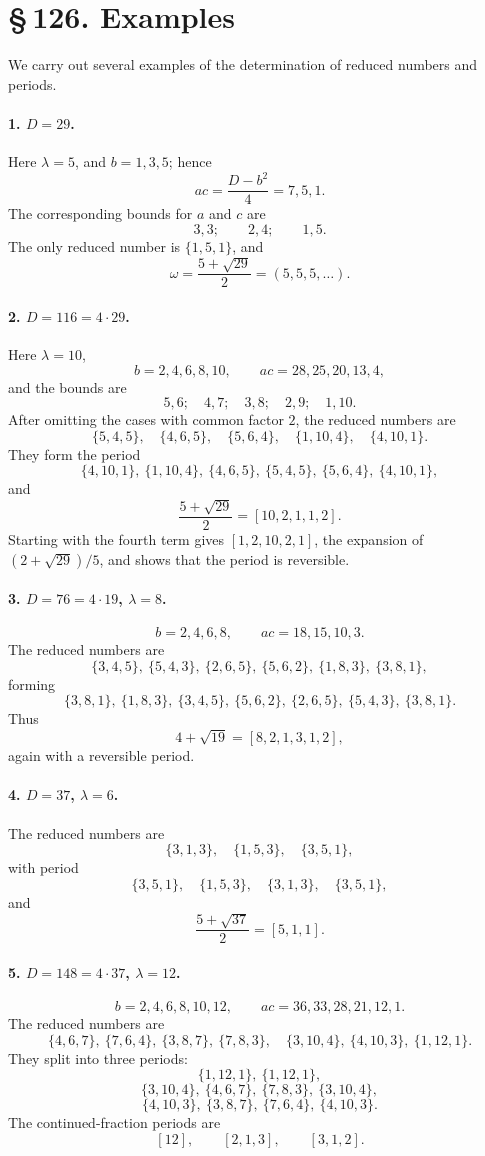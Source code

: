 \documentclass[11pt]{article}
\providecommand{\sect}[2]{\section*{\S\,#1. #2}}
\begin{document}
\sect{126}{Examples}

We carry out several examples of the determination of reduced numbers and periods.

\paragraph{1. $D=29$.}
Here $\lambda=5$, and $b=1,3,5$; hence
\[
        ac=\frac{D-b^2}{4}=7,5,1.
\]
The corresponding bounds for $a$ and $c$ are
\[
        3,3;\qquad 2,4;\qquad 1,5.
\]
The only reduced number is $\{1,5,1\}$, and
\[
        \omega=\frac{5+\sqrt{29}}2=(5,5,5,\ldots).
\]

\paragraph{2. $D=116=4\cdot29$.}
Here $\lambda=10$,
\[
        b=2,4,6,8,10,\qquad ac=28,25,20,13,4,
\]
and the bounds are
\[
        5,6;\quad 4,7;\quad 3,8;\quad 2,9;\quad 1,10.
\]
After omitting the cases with common factor $2$, the reduced numbers are
\[
\{5,4,5\},\quad \{4,6,5\},\quad \{5,6,4\},\quad
\{1,10,4\},\quad \{4,10,1\}.
\]
They form the period
\[
\{4,10,1\},\ \{1,10,4\},\ \{4,6,5\},\ \{5,4,5\},\ \{5,6,4\},\ \{4,10,1\},
\]
and
\[
        \frac{5+\sqrt{29}}2=[10,2,1,1,2].
\]
Starting with the fourth term gives $[1,2,10,2,1]$, the expansion of $(2+\sqrt{29})/5$, and shows that the period is reversible.

\paragraph{3. $D=76=4\cdot19$, $\lambda=8$.}
\[
        b=2,4,6,8,\qquad ac=18,15,10,3.
\]
The reduced numbers are
\[
\{3,4,5\},\ \{5,4,3\},\ \{2,6,5\},\ \{5,6,2\},\ \{1,8,3\},\ \{3,8,1\},
\]
forming
\[
\{3,8,1\},\ \{1,8,3\},\ \{3,4,5\},\ \{5,6,2\},\ \{2,6,5\},\ \{5,4,3\},\ \{3,8,1\}.
\]
Thus
\[
        4+\sqrt{19}=[8,2,1,3,1,2],
\]
again with a reversible period.

\paragraph{4. $D=37$, $\lambda=6$.}
The reduced numbers are
\[
        \{3,1,3\},\quad \{1,5,3\},\quad \{3,5,1\},
\]
with period
\[
        \{3,5,1\},\quad \{1,5,3\},\quad \{3,1,3\},\quad \{3,5,1\},
\]
and
\[
        \frac{5+\sqrt{37}}2=[5,1,1].
\]

\paragraph{5. $D=148=4\cdot37$, $\lambda=12$.}
\[
 b=2,4,6,8,10,12,\qquad ac=36,33,28,21,12,1.
\]
The reduced numbers are
\[
\{4,6,7\},\ \{7,6,4\},\ \{3,8,7\},\ \{7,8,3\},
\quad \{3,10,4\},\ \{4,10,3\},\ \{1,12,1\}.
\]
They split into three periods:
\[
\{1,12,1\},\ \{1,12,1\},
\]
\[
\{3,10,4\},\ \{4,6,7\},\ \{7,8,3\},\ \{3,10,4\},
\]
\[
\{4,10,3\},\ \{3,8,7\},\ \{7,6,4\},\ \{4,10,3\}.
\]
The continued-fraction periods are
\[
        [12],\qquad [2,1,3],\qquad [3,1,2].
\]
\end{document}
